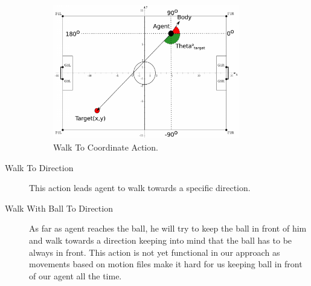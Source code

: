 \begin{description}
 \begin{figure}[t!]
\centering
  \includegraphics[width=0.8\textwidth]{Chapter3/figures/GoToPos.pdf}
  \caption{Walk To Coordinate Action.}
  \label{fig:WalkToCoordinate}
\end{figure}


 \item[Walk To Direction]
 This action leads agent to walk towards a specific direction.
 
 \item[Walk With Ball To Direction]
 As far as agent reaches the ball, he will try to keep the ball in front of him and walk towards a direction keeping into mind that the ball has to be always in front. This action is not yet functional in our approach as movements based on motion files make it hard for us keeping ball in front of our agent all the time.
 
\end{description}

